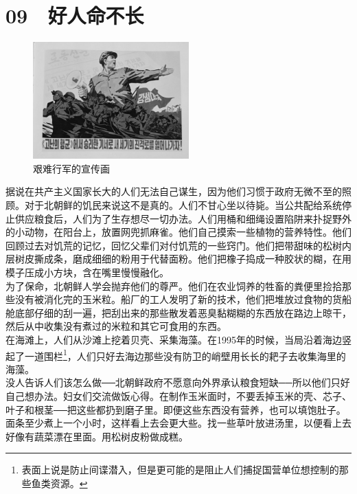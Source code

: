 \fancyhead[RO]{{\tiny{\textcolor{Gray}{\FA \ }}}\thepage}
\fancyhead[LE]{{\tiny{\textcolor{Gray}{\FA \ }}}\thepage}
\fancyfoot[LE,RO]{}
\fancyfoot[LO,CE]{}
\fancyfoot[CO,RE]{}
\chapter*{09 {\FA } 好人命不长}
\begin{figure}[!htbp]
	\centering
	\includegraphics[width=6cm]{./Chapters/Images/09.jpg}
	\caption*{艰难行军的宣传画}
\end{figure}


据说在共产主义国家长大的人们无法自己谋生，因为他们习惯于政府无微不至的照顾。对于北朝鲜的饥民来说这不是真的。人们不甘心坐以待毙。当公共配给系统停止供应粮食后，人们为了生存想尽一切办法。人们用桶和细绳设置陷阱来扑捉野外的小动物，在阳台上，放置网兜抓麻雀。他们自己摸索一些植物的营养特性。他们回顾过去对饥荒的记忆，回忆父辈们对付饥荒的一些窍门。他们把带甜味的松树内层树皮撕成条，磨成细细的粉用于代替面粉。他们把橡子捣成一种胶状的糊，在用模子压成小方块，含在嘴里慢慢融化。\\

为了保命，北朝鲜人学会抛弃他们的尊严。他们在农业饲养的牲畜的粪便里捡拾那些没有被消化完的玉米粒。船厂的工人发明了新的技术，他们把堆放过食物的货船舱底部仔细的刮一遍，把刮出来的那些散发着恶臭黏糊糊的东西放在路边上晾干，然后从中收集没有煮过的米粒和其它可食用的东西。\\

在海滩上，人们从沙滩上挖着贝壳、采集海藻。在1995年的时候，当局沿着海边竖起了一道围栏\footnote{表面上说是防止间谍潜入，但是更可能的是阻止人们捕捉国营单位想控制的那些鱼类资源。}，人们只好去海边那些没有防卫的峭壁用长长的耙子去收集海里的海藻。\\

没人告诉人们该怎么做──北朝鲜政府不愿意向外界承认粮食短缺──所以他们只好自己想办法。妇女们交流做饭心得。在制作玉米面时，不要丢掉玉米的壳、芯子、叶子和根茎──把这些都扔到磨子里。即便这些东西没有营养，也可以填饱肚子。面条至少煮上一个小时，这样看上去会更大些。找一些草叶放进汤里，以便看上去好像有蔬菜漂在里面。用松树皮粉做成糕。\\


